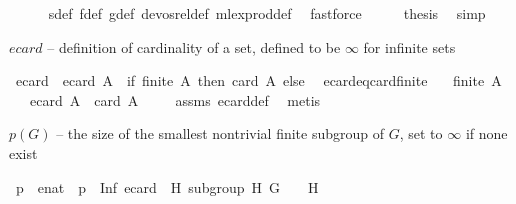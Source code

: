 \begin{isabellebody}
\ \ \ \ \isamarkupfalse%
\ s{\isacharunderscore}{\kern0pt}def\ f{\isacharunderscore}{\kern0pt}def\ g{\isacharunderscore}{\kern0pt}def\ devos{\isacharunderscore}{\kern0pt}rel{\isacharunderscore}{\kern0pt}def\ mlex{\isacharunderscore}{\kern0pt}prod{\isacharunderscore}{\kern0pt}def\ \isamarkupfalse%
\ fastforce\isanewline
\ \ \isamarkupfalse%
\ \isamarkupfalse%
\ {\isacharquery}{\kern0pt}thesis\ \isamarkupfalse%
\ simp\isanewline
{}\isamarkupfalse%
%
\endisatagproof
{\isafoldproof}%
%
\isadelimproof
%
\endisadelimproof
%
\isadelimdocument
%
\endisadelimdocument
%
\isatagdocument
%
\isamarkuptrue%
%
\endisatagdocument
{\isafolddocument}%
%
\isadelimdocument
%
\endisadelimdocument
%
\begin{isamarkuptext}%
$ecard$ -- definition of cardinality of a set, defined to be $\infty$ for infinite sets%
\end{isamarkuptext}\isamarkuptrue%
\isamarkupfalse%
\ ecard\ \ {\isachardoublequoteopen}ecard\ A\ {\isacharequal}{\kern0pt}\ {\isacharparenleft}{\kern0pt}if\ finite\ A\ then\ card\ A\ else\ {\isasyminfinity}{\isacharparenright}{\kern0pt}{\isachardoublequoteclose}\isanewline
\isanewline
{}\isamarkupfalse%
\ ecard{\isacharunderscore}{\kern0pt}eq{\isacharunderscore}{\kern0pt}card{\isacharunderscore}{\kern0pt}finite{\isacharcolon}{\kern0pt}\isanewline
\ \ \ {\isachardoublequoteopen}finite\ A{\isachardoublequoteclose}\isanewline
\ \ \ {\isachardoublequoteopen}ecard\ A\ {\isacharequal}{\kern0pt}\ card\ A{\isachardoublequoteclose}\ \isanewline
%
\isadelimproof
\ \ %
\endisadelimproof
%
\isatagproof
{}\isamarkupfalse%
\ assms\ ecard{\isacharunderscore}{\kern0pt}def\ \isamarkupfalse%
\ metis%
\endisatagproof
{\isafoldproof}%
%
\isadelimproof
%
\endisadelimproof
%
\begin{isamarkuptext}%
$p(G)$ -- the size of the smallest nontrivial finite subgroup of $G$, set to $\infty$ if none exist%
\end{isamarkuptext}\isamarkuptrue%
\isamarkupfalse%
\ p\ {\isacharcolon}{\kern0pt}{\isacharcolon}{\kern0pt}\ enat\ \ {\isachardoublequoteopen}p\ {\isacharequal}{\kern0pt}\ Inf\ {\isacharparenleft}{\kern0pt}ecard\ {\isacharbackquote}{\kern0pt}\ {\isacharbraceleft}{\kern0pt}H{\isachardot}{\kern0pt}\ subgroup\ H\ G\ {\isacharparenleft}{\kern0pt}{\isasymcdot}{\isacharparenright}{\kern0pt}\ {\isasymone}\ {\isasymand}\ H\ {\isasymnoteq}\ {\isacharbraceleft}{\kern0pt}{\isasymone}{\isacharbraceright}{\kern0pt}{\isacharbraceright}{\kern0pt}{\isacharparenright}{\kern0pt}{\isachardoublequoteclose}\isanewline

\end{isabellebody}
